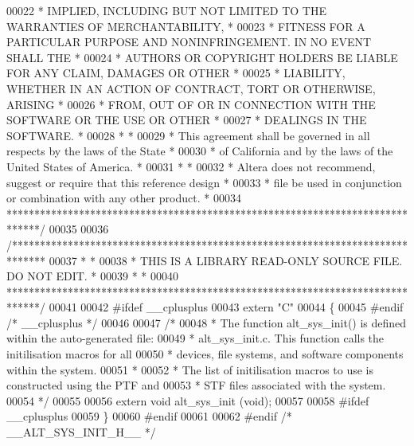 \begin{DoxyCode}
00022 \textcolor{comment}{* IMPLIED, INCLUDING BUT NOT LIMITED TO THE WARRANTIES OF MERCHANTABILITY,    *}
00023 \textcolor{comment}{* FITNESS FOR A PARTICULAR PURPOSE AND NONINFRINGEMENT. IN NO EVENT SHALL THE *}
00024 \textcolor{comment}{* AUTHORS OR COPYRIGHT HOLDERS BE LIABLE FOR ANY CLAIM, DAMAGES OR OTHER      *}
00025 \textcolor{comment}{* LIABILITY, WHETHER IN AN ACTION OF CONTRACT, TORT OR OTHERWISE, ARISING     *}
00026 \textcolor{comment}{* FROM, OUT OF OR IN CONNECTION WITH THE SOFTWARE OR THE USE OR OTHER         *}
00027 \textcolor{comment}{* DEALINGS IN THE SOFTWARE.                                                   *}
00028 \textcolor{comment}{*                                                                             *}
00029 \textcolor{comment}{* This agreement shall be governed in all respects by the laws of the State   *}
00030 \textcolor{comment}{* of California and by the laws of the United States of America.              *}
00031 \textcolor{comment}{*                                                                             *}
00032 \textcolor{comment}{* Altera does not recommend, suggest or require that this reference design    *}
00033 \textcolor{comment}{* file be used in conjunction or combination with any other product.          *}
00034 \textcolor{comment}{******************************************************************************/}
00035 
00036 \textcolor{comment}{/******************************************************************************}
00037 \textcolor{comment}{*                                                                             *}
00038 \textcolor{comment}{* THIS IS A LIBRARY READ-ONLY SOURCE FILE. DO NOT EDIT.                       *}
00039 \textcolor{comment}{*                                                                             *}
00040 \textcolor{comment}{******************************************************************************/}
00041 
00042 \textcolor{preprocessor}{#ifdef \_\_cplusplus}
00043 \textcolor{keyword}{extern} \textcolor{stringliteral}{"C"}
00044 \{
00045 \textcolor{preprocessor}{#endif }\textcolor{comment}{/* \_\_cplusplus */}\textcolor{preprocessor}{}
00046 
00047 \textcolor{comment}{/*}
00048 \textcolor{comment}{ * The function alt\_sys\_init() is defined within the auto-generated file:}
00049 \textcolor{comment}{ * alt\_sys\_init.c. This function calls the initilisation macros for all}
00050 \textcolor{comment}{ * devices, file systems, and software components within the system.}
00051 \textcolor{comment}{ *}
00052 \textcolor{comment}{ * The list of initilisation macros to use is constructed using the PTF and}
00053 \textcolor{comment}{ * STF files associated with the system.}
00054 \textcolor{comment}{ */}
00055 
00056 \textcolor{keyword}{extern} \textcolor{keywordtype}{void} alt_sys_init (\textcolor{keywordtype}{void});
00057 
00058 \textcolor{preprocessor}{#ifdef \_\_cplusplus}
00059 \}
00060 \textcolor{preprocessor}{#endif}
00061  
00062 \textcolor{preprocessor}{#endif }\textcolor{comment}{/* \_\_ALT\_SYS\_INIT\_H\_\_ */}\textcolor{preprocessor}{}
\end{DoxyCode}
